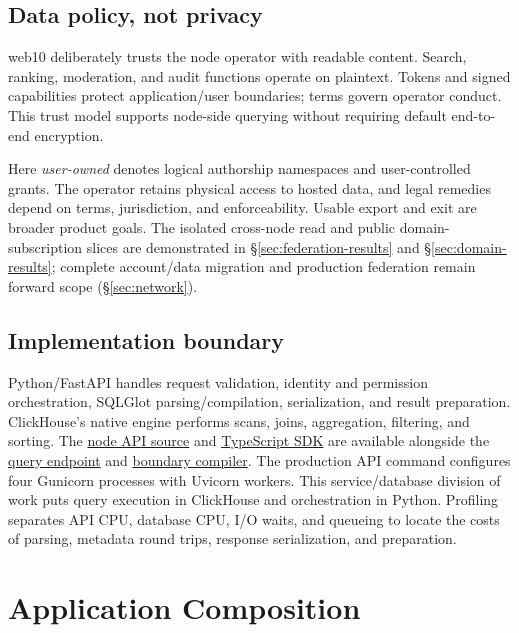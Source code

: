 \documentclass[sigconf, nonacm]{acmart}
\newcommand{\artifactbase}{https://github.com/jacoby149/web10}
\newcommand{\artifactrev}{317fa349eae714ddde07f249ca65cdaa34b6459b}
\newcommand{\artifactdir}[2]{\href{\artifactbase/tree/\artifactrev/#1}{#2}}
\newcommand{\artifactfile}[2]{\href{\artifactbase/blob/\artifactrev/#1}{#2}}
\begin{document}
\subsection{Data policy, not privacy}

web10 deliberately trusts the node operator with readable content. Search,
ranking, moderation, and audit functions operate on plaintext. Tokens and signed
capabilities protect application/user boundaries; terms govern operator conduct.
This trust model supports node-side querying without requiring default
end-to-end encryption.

Here \emph{user-owned} denotes logical authorship namespaces and user-controlled
grants. The operator retains physical access to hosted data, and legal remedies
depend on terms, jurisdiction, and enforceability. Usable export and exit are
broader product goals. The isolated cross-node read and public domain-subscription
slices are demonstrated in \S\ref{sec:federation-results} and
\S\ref{sec:domain-results}; complete account/data migration and production
federation remain forward scope (\S\ref{sec:network}).

\subsection{Implementation boundary}

Python/FastAPI handles request validation, identity and permission orchestration,
SQLGlot parsing/compilation, serialization, and result preparation. ClickHouse's
native engine performs scans, joins, aggregation, filtering, and sorting.
The \artifactdir{api/app}{node API source} and
\artifactdir{sdk/src}{TypeScript SDK} are available alongside the
\artifactfile{api/app/v3/endpoints/query.py}{query endpoint} and
\artifactfile{api/app/v3/services/safe_query.py}{boundary compiler}.
The production API command configures four Gunicorn processes with Uvicorn
workers. This service/database division of work puts query execution in
ClickHouse and orchestration in Python. Profiling separates API CPU, database
CPU, I/O waits, and queueing to locate the costs of parsing, metadata round
trips, response serialization, and preparation.

\section{Application Composition}
\label{sec:eval}
\end{document}
